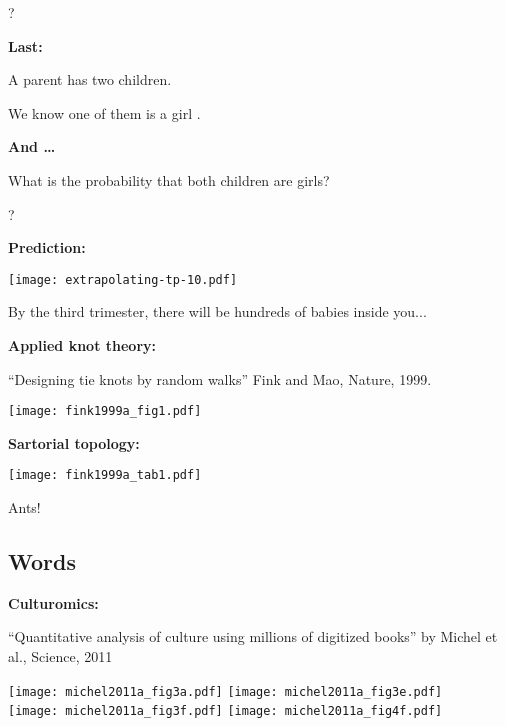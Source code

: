       {\alert{?}}
    
  

  \textbf{Last:}
    
    
      A parent has two children.
    
      We know one of them is a girl .
    
  
  
  \textbf{And \ldots}
    
    
      What is the probability that both
      children are girls?
    
      {\alert{?}}
    
  

  


  \textbf{Prediction:}

  \texttt{[image: extrapolating-tp-10.pdf]}\\

  {By the third trimester, there will be hundreds of babies inside you...}



  \textbf{Applied knot theory:}

  ``Designing tie knots by random walks''\cite{fink1999a}
  Fink and Mao, Nature, 1999.

  \texttt{[image: fink1999a\_fig1.pdf]}


  \textbf{Sartorial topology:}
  
  \texttt{[image: fink1999a\_tab1.pdf]}



  Ants!


\subsection{Words}

  \textbf{Culturomics:}

  \small{``Quantitative analysis of culture using millions of
    digitized books'' by Michel et al., Science, 2011\cite{michel2011a}}

  \texttt{[image: michel2011a\_fig3a.pdf]} 
  \texttt{[image: michel2011a\_fig3e.pdf]} \\
  \texttt{[image: michel2011a\_fig3f.pdf]}
  \texttt{[image: michel2011a\_fig4f.pdf]}

  {\small
    \\
  }


